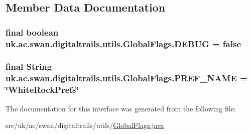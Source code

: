 \subsection{Member Data Documentation}
\hypertarget{interfaceuk_1_1ac_1_1swan_1_1digitaltrails_1_1utils_1_1_global_flags_ab66530eac1afabd42e6dfa7819cba196}{
\subsubsection[{D\+E\+B\+U\+G}]{\setlength{\rightskip}{0pt plus 5cm}final boolean uk.\+ac.\+swan.\+digitaltrails.\+utils.\+Global\+Flags.\+D\+E\+B\+U\+G = false\hspace{0.3cm}{\ttfamily [static]}}}\label{interfaceuk_1_1ac_1_1swan_1_1digitaltrails_1_1utils_1_1_global_flags_ab66530eac1afabd42e6dfa7819cba196}
\hypertarget{interfaceuk_1_1ac_1_1swan_1_1digitaltrails_1_1utils_1_1_global_flags_a95ec83059f5234100d715662a0c79ba8}{
\subsubsection[{P\+R\+E\+F\+\_\+\+N\+A\+M\+E}]{\setlength{\rightskip}{0pt plus 5cm}final String uk.\+ac.\+swan.\+digitaltrails.\+utils.\+Global\+Flags.\+P\+R\+E\+F\+\_\+\+N\+A\+M\+E = \char`\"{}White\+Rock\+Prefs\char`\"{}\hspace{0.3cm}{\ttfamily [static]}}}\label{interfaceuk_1_1ac_1_1swan_1_1digitaltrails_1_1utils_1_1_global_flags_a95ec83059f5234100d715662a0c79ba8}


The documentation for this interface was generated from the following file\+:\begin{DoxyCompactItemize}
\item 
src/uk/ac/swan/digitaltrails/utils/\hyperlink{_global_flags_8java}{Global\+Flags.\+java}\end{DoxyCompactItemize}
